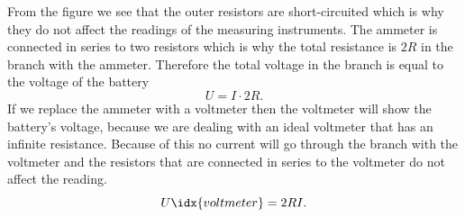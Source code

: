 \solueng
From the figure we see that the outer resistors are short-circuited which is why they do not affect the readings of the measuring instruments. The ammeter is connected in series to two resistors which is why the total resistance is $2R$ in the branch with the ammeter. Therefore the total voltage in the branch is equal to the voltage of the battery
\[ U = I\cdot 2R.\] 
If we replace the ammeter with a voltmeter then the voltmeter will show the battery’s voltage, because we are dealing with an ideal voltmeter that has an infinite resistance. Because of this no current will go through the branch with the voltmeter and the resistors that are connected in series to the voltmeter do not affect the reading.
\[ U\idx{voltmeter} = 2RI.\]
\probend